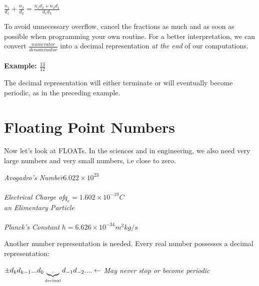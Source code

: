 \documentclass[a4paper,12pt,]{report}
\begin{document}
\begin{center}
	\Large{$\frac{n_1}{d_1}+\frac{n_2}{d_2}=\frac{n_1d_2+n_2d_1}{d_1d_2}$}
\end{center}

	To avoid unnecessary overflow, cancel the fractions as much and as soon as possible when 
	programming your own routine. For a better interpretation, we can convert
	$\frac{numerator}{denominator}$ into a decimal representation \textit{at the end} of our 
	computations.\\ \\

	\noindent \textbf{Example: \Large{$\frac{13}{12}$}}\\

\begin{center}
\end{center}

	The decimal representation will either terminate or will eventually become periodic, as in the 
	preceding example.

\section{Floating Point Numbers}

	Now let's look at FLOATs. In the sciences and in engineering, we also need very large numbers 
	and very small numbers, i.e close to zero.

\begin{tabbing}
	\hspace*{2cm}\=\textit{Avogadro's Number}\hspace*{2cm}\=$6.022\times10^{23}$\\ \\
	\>\textit{Electrical Charge of}\>$q_e=1.602\times10^{-19}C$\\
	\> \textit{an Elimentary Particle}\\ \\
	\> \textit{Planck's Constant} \>$h=6.626\times10^{-34} m^2kg/s$
\end{tabbing}

	Another number representation is needed. Every real number possesses a decimal representation:

\begin{center}
	$\pm d_k d_{k-1} ... d_0 \underbrace{.}_{\text{\tiny{decimal}}} d_{-1} d_{-2} ....\leftarrow$
	\footnotesize{\textit{May never stop or become periodic}}
\end{center}
\end{document}
